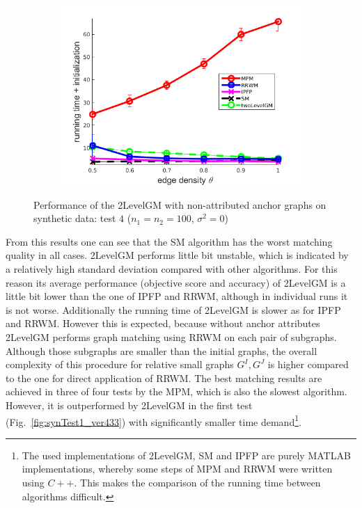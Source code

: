 \begin{figure}
\begin{subfigure}[b]{0.33\textwidth}
			\includegraphics[scale=0.25]{"chapter3/fig/SyntheticTest/no_descr/Results_v4.3.3/Test4/time_summary_avg10t"} 
		\end{subfigure} 	
	\caption[Performance of the 2LevelGM with non-attributed anchor graphs on synthetic data (test $4$)]{Performance of the 2LevelGM with non-attributed anchor graphs on synthetic data: test $4$ ($n_1=n_2=100$, $\sigma^2=0$)}
	\label{fig:synTest4_ver433}
\end{figure}

From this results one can see that the SM algorithm has the worst matching quality in all cases. 2LevelGM performs little bit unstable, which is indicated by a relatively high standard deviation compared with other algorithms. For this reason its average performance (objective score and accuracy) of 2LevelGM is a little bit lower than the one of IPFP and RRWM, although in individual runs it is not worse. Additionally the running time of 2LevelGM is slower as for IPFP and RRWM. However this is expected, because without anchor attributes 2LevelGM performs graph matching using RRWM on each pair of subgraphs. Although those subgraphs are smaller than the initial graphs, the overall complexity of this procedure for relative small graphs $G^I,G^J$ is higher compared to the one for direct application of RRWM. The best matching results are achieved in three of four tests by the MPM, which is also the slowest algorithm. However, it is outperformed by 2LevelGM in the first test (Fig.~\ref{fig:synTest1_ver433}) with significantly smaller time demand\footnote{The used implementations of 2LevelGM, SM and IPFP are purely MATLAB implementations, whereby some steps of MPM and RRWM were written using $C++$. This makes the comparison of the running time between algorithms difficult.}.

